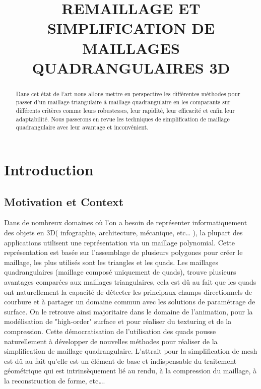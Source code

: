 \documentclass[runningheads]{llncs}
\begin{document}
%
\title{REMAILLAGE ET SIMPLIFICATION DE
MAILLAGES QUADRANGULAIRES 3D}
%
%


%
\maketitle              %
%

\begin{abstract}
Dans cet état de l'art nous allons mettre en perspective les différentes méthodes pour passer d'un maillage triangulaire à maillage quadrangulaire en les comparants sur différents critères comme leurs robustesses, leur rapidité, leur efficacité et enfin leur adaptabilité. Nous passerons en revue les techniques de simplification de maillage quadrangulaire avec leur avantage et inconvénient.

\end{abstract}

\section{Introduction}
\subsection{Motivation et Context}
Dans de nombreux domaines où l'on a besoin de représenter informatiquement des objets en 3D( infographie, architecture, mécanique, etc… ), la plupart des applications utilisent une représentation via un maillage polynomial. Cette représentation est basée sur l’assemblage de plusieurs polygones pour créer le maillage, les plus utilisés sont les triangles et les quads. Les maillages quadrangulaires (maillage composé uniquement de quads), trouve plusieurs avantages comparées aux maillages triangulaires, cela est dû au fait que les quads ont naturellement la capacité de détecter les principaux champs directionnels de courbure et à partager un domaine commun avec les solutions de paramétrage de surface.  On le retrouve ainsi majoritaire dans le domaine de l'animation, pour la modélisation de "high-order" surface et pour réaliser du texturing et de la compression. Cette démocratisation de l’utilisation des quads pousse naturellement à développer de nouvelles méthodes pour réaliser de la simplification de maillage quadrangulaire. L'attrait pour la simplification de mesh est dû au fait qu’elle est un élément de base et indispensable du traitement géométrique qui est intrinsèquement lié au rendu, à la compression du maillage, à la reconstruction de forme, etc….
\end{document}
